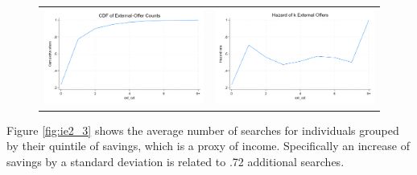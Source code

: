 \documentclass[12pt]{article}
\begin{document}
\begin{figure}[H]
\caption{}
 \label{fig:ie2_2}
\centering{}%
\begin{tabular}{cc}
\includegraphics[scale=0.27]{figures/IE2_CDF_number_extoffers.png} &\includegraphics[scale=0.27]{figures/IE2_hazard_number_extoffers.png}
\end{tabular}
\end{figure}



Figure \ref{fig:ie2_3} shows the average number of searches for individuals grouped by their quintile of savings, which is a proxy of income. Specifically an increase of savings by a standard deviation is related to .72 additional searches. 
\end{document}
